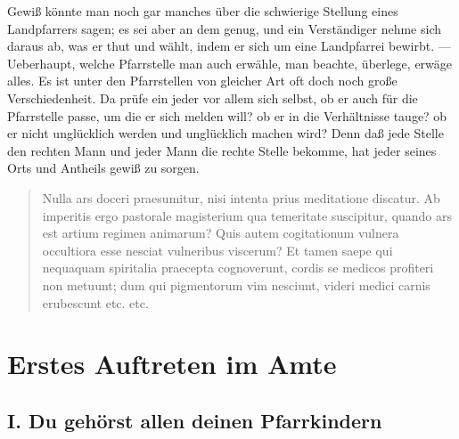 Gewiß könnte man noch gar manches über die schwierige Stellung eines Landpfarrers sagen; es sei aber an dem genug, und ein Verständiger nehme sich daraus ab, was er thut und wählt, indem er sich um eine Landpfarrei bewirbt. — Ueberhaupt, welche Pfarrstelle man auch erwähle, man beachte, überlege, erwäge alles. Es ist unter den Pfarrstellen von gleicher Art oft doch noch große Verschiedenheit. Da prüfe ein jeder vor allem sich selbst, ob er auch für die Pfarrstelle passe, um die er sich melden will? ob er in die Verhältnisse tauge? ob er nicht unglücklich werden und unglücklich machen wird? Denn daß jede Stelle den rechten Mann und jeder Mann die rechte Stelle bekomme, hat jeder seines Orts und Antheils gewiß zu sorgen.

\trenner

\begin{quote}
Nulla ars doceri praesumitur, nisi intenta prius meditatione discatur. Ab imperitis ergo pastorale magisterium qua temeritate suscipitur, quando ars est artium regimen animarum? Quis autem cogitationum vulnera occultiora esse nesciat vulneribus viscerum? Et tamen saepe qui nequaquam spiritalia praecepta cognoverunt, cordis se medicos profiteri non metuunt; dum qui pigmentorum vim nesciunt, videri medici carnis erubescunt etc. etc.
\end{quote}


\trenner

\chapter{Erstes Auftreten im Amte}


\section[I. Du gehörst allen Pfarrkindern]{I. Du gehörst allen deinen Pfarrkindern}

